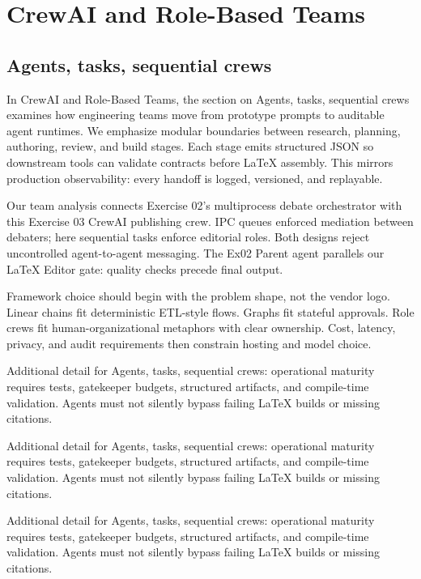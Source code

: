 \section{CrewAI and Role-Based Teams}

\subsection{Agents, tasks, sequential crews}
In CrewAI and Role-Based Teams, the section on Agents, tasks, sequential crews examines how engineering teams move from prototype prompts to auditable agent runtimes. We emphasize modular boundaries between research, planning, authoring, review, and build stages. Each stage emits structured JSON so downstream tools can validate contracts before LaTeX assembly. This mirrors production observability: every handoff is logged, versioned, and replayable. \cite{crewai2024} \cite{langgraph2024}

Our team analysis connects Exercise 02's multiprocess debate orchestrator with this Exercise 03 CrewAI publishing crew. IPC queues enforced mediation between debaters; here sequential tasks enforce editorial roles. Both designs reject uncontrolled agent-to-agent messaging. The Ex02 Parent agent parallels our LaTeX Editor gate: quality checks precede final output. \cite{crewai2024} \cite{langgraph2024}

Framework choice should begin with the problem shape, not the vendor logo. Linear chains fit deterministic ETL-style flows. Graphs fit stateful approvals. Role crews fit human-organizational metaphors with clear ownership. Cost, latency, privacy, and audit requirements then constrain hosting and model choice. \cite{crewai2024} \cite{langgraph2024}

Additional detail for Agents, tasks, sequential crews: operational maturity requires tests, gatekeeper budgets, structured artifacts, and compile-time validation. Agents must not silently bypass failing LaTeX builds or missing citations. \cite{crewai2024} \cite{langgraph2024}

Additional detail for Agents, tasks, sequential crews: operational maturity requires tests, gatekeeper budgets, structured artifacts, and compile-time validation. Agents must not silently bypass failing LaTeX builds or missing citations. \cite{crewai2024} \cite{langgraph2024}

Additional detail for Agents, tasks, sequential crews: operational maturity requires tests, gatekeeper budgets, structured artifacts, and compile-time validation. Agents must not silently bypass failing LaTeX builds or missing citations. \cite{crewai2024} \cite{langgraph2024}

